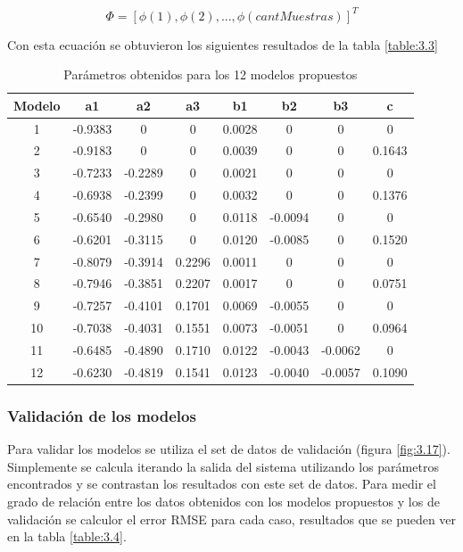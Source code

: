 \[ \Phi = [\phi(1),\phi(2),...,\phi(cantMuestras)]^T \]

Con esta ecuación se obtuvieron los siguientes resultados de la tabla \ref{table:3.3}

\begin{table}[!ht]
	\begin{center}
		
		\begin{tabular}{|c|c|c|c|c|c|c|c|}
			\hline
			\rowcolor{OODlightblue}
			Modelo & a1 & a2 & a3 & b1 & b2 & b3 & c   \\
			\hline \hline
			1 & -0.9383 & 0 & 0 & 0.0028 & 0 & 0 & 0 \\
			\hline
			2 & -0.9183 & 0 & 0 & 0.0039 & 0 & 0 & 0.1643 \\
			\hline
			3 & -0.7233 & -0.2289 & 0 & 0.0021 & 0 & 0 & 0 \\
			\hline
			4 & -0.6938 & -0.2399 & 0 & 0.0032 & 0 & 0 & 0.1376 \\
			\hline
			5 & -0.6540 & -0.2980 & 0 & 0.0118 & -0.0094 & 0 & 0 \\
			\hline
			6 & -0.6201 & -0.3115 & 0 & 0.0120 & -0.0085 & 0 & 0.1520 \\
			\hline
			7 & -0.8079 & -0.3914 & 0.2296 & 0.0011 & 0 & 0 & 0 \\
			\hline
			8 & -0.7946 & -0.3851 & 0.2207 & 0.0017 & 0 & 0 & 0.0751 \\
			\hline
			9 & -0.7257 & -0.4101 & 0.1701 & 0.0069 & -0.0055 & 0 & 0 \\
			\hline
			10 & -0.7038 & -0.4031 & 0.1551 & 0.0073 & -0.0051 & 0 & 0.0964 \\
			\hline
			11 & -0.6485 & -0.4890 & 0.1710 & 0.0122 & -0.0043 & -0.0062 & 0 \\
			\hline
			12 & -0.6230 & -0.4819 & 0.1541 & 0.0123 & -0.0040 & -0.0057 & 0.1090 \\
			\hline
		\end{tabular}
	\end{center}
	\caption{Parámetros obtenidos para los 12 modelos propuestos}
	\label{table:\thetable}
\end{table}


\subsubsection{Validación de los modelos}
Para validar los modelos se utiliza el set de datos de validación (figura \ref{fig:3.17}). Simplemente se calcula iterando la salida del sistema utilizando los parámetros encontrados y se contrastan los resultados con este set de datos. Para medir el grado de relación entre los datos obtenidos con los modelos propuestos y los de validación se calculor el error RMSE para cada caso, resultados que se pueden ver en la tabla \ref{table:3.4}.

